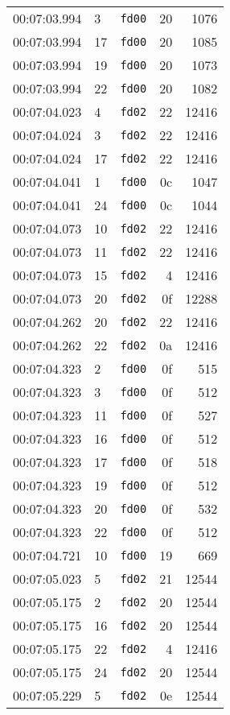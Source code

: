 \documentclass{article}
\begin{document}
\begin{longtable}{lllrr}
00:07:03.994 & 3 & \texttt{fd00} & 20 & 1076 \\
00:07:03.994 & 17 & \texttt{fd00} & 20 & 1085 \\
00:07:03.994 & 19 & \texttt{fd00} & 20 & 1073 \\
00:07:03.994 & 22 & \texttt{fd00} & 20 & 1082 \\
00:07:04.023 & 4 & \texttt{fd02} & 22 & 12416 \\
00:07:04.024 & 3 & \texttt{fd02} & 22 & 12416 \\
00:07:04.024 & 17 & \texttt{fd02} & 22 & 12416 \\
00:07:04.041 & 1 & \texttt{fd00} & 0c & 1047 \\
00:07:04.041 & 24 & \texttt{fd00} & 0c & 1044 \\
00:07:04.073 & 10 & \texttt{fd02} & 22 & 12416 \\
00:07:04.073 & 11 & \texttt{fd02} & 22 & 12416 \\
00:07:04.073 & 15 & \texttt{fd02} & 4 & 12416 \\
00:07:04.073 & 20 & \texttt{fd02} & 0f & 12288 \\
00:07:04.262 & 20 & \texttt{fd02} & 22 & 12416 \\
00:07:04.262 & 22 & \texttt{fd02} & 0a & 12416 \\
00:07:04.323 & 2 & \texttt{fd00} & 0f & 515 \\
00:07:04.323 & 3 & \texttt{fd00} & 0f & 512 \\
00:07:04.323 & 11 & \texttt{fd00} & 0f & 527 \\
00:07:04.323 & 16 & \texttt{fd00} & 0f & 512 \\
00:07:04.323 & 17 & \texttt{fd00} & 0f & 518 \\
00:07:04.323 & 19 & \texttt{fd00} & 0f & 512 \\
00:07:04.323 & 20 & \texttt{fd00} & 0f & 532 \\
00:07:04.323 & 22 & \texttt{fd00} & 0f & 512 \\
00:07:04.721 & 10 & \texttt{fd00} & 19 & 669 \\
00:07:05.023 & 5 & \texttt{fd02} & 21 & 12544 \\
00:07:05.175 & 2 & \texttt{fd02} & 20 & 12544 \\
00:07:05.175 & 16 & \texttt{fd02} & 20 & 12544 \\
00:07:05.175 & 22 & \texttt{fd02} & 4 & 12416 \\
00:07:05.175 & 24 & \texttt{fd02} & 20 & 12544 \\
00:07:05.229 & 5 & \texttt{fd02} & 0e & 12544 \\

\end{longtable}
\end{document}
